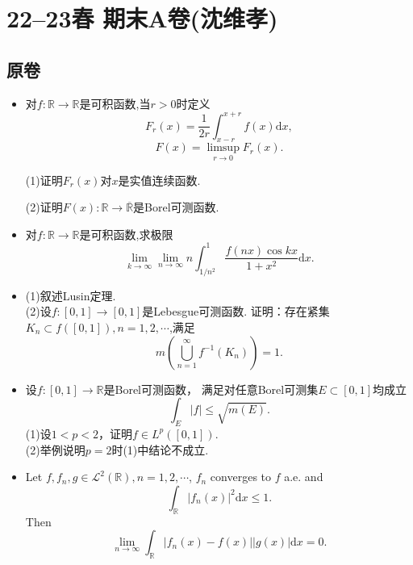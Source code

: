 \section{22--23春 期末A卷(沈维孝)}

\subsection{原卷}
\begin{itemize}
\item[一、]
对$ f\colon\mathbb{R} \to \mathbb{R}  $是可积函数,当$ r>0 $时定义
$$F_r( x ) =\frac{1}{2r}\int_{x-r}^{x+r}{f( x ) \text{d}x},$$
$$F( x ) =\limsup_{r\to0} F_r( x ).$$

(1)证明$ F_{r}(x) $对$ x $是实值连续函数.

(2)证明$ F(x) : \mathbb{R} \to \overline{\mathbb{R}}$是Borel可测函数.

\item[二、]
对$f\colon\mathbb{R} \to \mathbb{R}$是可积函数,求极限
$$\lim_{k\rightarrow \infty}\lim_{n\rightarrow \infty}
n\int_{1/n^2}^1{\frac{f(nx) \cos kx}{1+x^2}\text{d}x}.$$

\item[三、]
(1)叙述Lusin定理.\\
(2)设$f\colon[0,1]\rightarrow [0,1]$是Lebesgue可测函数.
证明：存在紧集$K_n \subset f([0,1]),n=1,2,\cdots$,满足
\[m(\bigcup_{n=1}^{\infty}f^{-1}(K_n))=1.\]

\item[四、]设$f\colon[0,1]\rightarrow \mathbb{R}$是Borel可测函数，
满足对任意Borel可测集$E\subset[0,1]$均成立
\[\int_{E}|f|\leq\sqrt{m(E)}.\]
(1)设$1<p<2$，证明$f\in L^{p}([0,1])$.\\
(2)举例说明$p=2$时(1)中结论不成立.



\item[五、]
Let $ f,f_{n},g\in \mathcal{L} ^{2}(\mathbb{R} ),n=1,2,\cdots $, 
$ f_{n} $ converges to $ f $ a.e. and
$$\int_{\mathbb{R}}|f_n(x)|^2\mathrm{d}x\le 1.$$
Then
$$\lim_{n\rightarrow \infty}\int_{\mathbb{R}}|f_n(x)-f(x)||g(x)|\mathrm{d}x=0.$$
\end{itemize}

